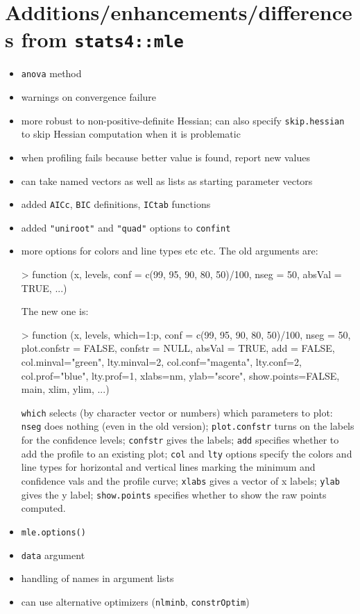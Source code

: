 \documentclass{article}
\newcommand{\code}[1]{{\tt #1}}
\begin{document}
\section*{Additions/enhancements/differences from \code{stats4::mle}}
\begin{itemize}
\item{\code{anova} method}
\item{warnings on convergence failure}
\item{more robust to non-positive-definite Hessian;
  can also specify \code{skip.hessian} to skip Hessian
  computation when it is problematic}
\item{when profiling fails because better value is
    found, report new values}
\item{can take named vectors as well as lists as
    starting parameter vectors}
\item{added \code{AICc}, \code{BIC} definitions,
    \code{ICtab} functions}
\item{added \code{"uniroot"} and \code{"quad"}
    options to \code{confint}}
\item{more options for colors and line types etc etc.
The old arguments are:
\begin{Schunk}
\begin{Sinput}
> function (x, levels, conf = c(99, 95, 90, 80, 50)/100, nseg = 50,
           absVal = TRUE, ...) {}
\end{Sinput}
\end{Schunk}
The new one is:
\begin{Schunk}
\begin{Sinput}
> function (x, levels, which=1:p, conf = c(99, 95, 90, 80, 50)/100, nseg = 50,
           plot.confstr = FALSE, confstr = NULL, absVal = TRUE, add = FALSE,
           col.minval="green", lty.minval=2,
           col.conf="magenta", lty.conf=2,
           col.prof="blue", lty.prof=1,
           xlabs=nm, ylab="score",
           show.points=FALSE,
           main, xlim, ylim, ...) {}
\end{Sinput}
\end{Schunk}
\code{which} selects (by character vector or numbers)
which parameters to plot: \code{nseg} does nothing
(even in the old version); \code{plot.confstr} turns on
the labels for the confidence levels; \code{confstr} gives
the labels; \code{add} specifies whether to add the
profile to an existing plot; \code{col} and \code{lty}
options specify the colors and line types for
horizontal and vertical lines marking the minimum
and confidence vals and the profile curve; \code{xlabs}
gives a vector of x labels; \code{ylab} gives the y label;
\code{show.points} specifies whether to show the raw points
computed.
}
\item{\code{mle.options()}}
\item{\code{data} argument}
\item{handling of names in argument lists}
\item{can use alternative optimizers (\code{nlminb}, \code{constrOptim})}
\end{itemize}
\end{document}
